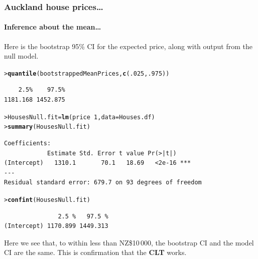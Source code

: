 \documentclass{beamer}\usepackage[]{graphicx}\usepackage[]{xcolor}
\makeatletter
\newcommand{\hlnum}[1]{\textcolor[rgb]{0.686,0.059,0.569}{#1}}%
\newcommand{\hlopt}[1]{\textcolor[rgb]{0,0,0}{#1}}%
\newcommand{\hlstd}[1]{\textcolor[rgb]{0.345,0.345,0.345}{#1}}%
\newcommand{\hlkwb}[1]{\textcolor[rgb]{0.69,0.353,0.396}{#1}}%
\newcommand{\hlkwc}[1]{\textcolor[rgb]{0.333,0.667,0.333}{#1}}%
\newcommand{\hlkwd}[1]{\textcolor[rgb]{0.737,0.353,0.396}{\textbf{#1}}}%
\newenvironment{kframe}{%
 \def\at@end@of@kframe{}%
 \ifinner\ifhmode%
  \def\at@end@of@kframe{\end{minipage}}%
  \begin{minipage}{\columnwidth}%
 \fi\fi%
 \def\FrameCommand##1{\hskip\@totalleftmargin \hskip-\fboxsep
 \colorbox{shadecolor}{##1}\hskip-\fboxsep
     \hskip-\linewidth \hskip-\@totalleftmargin \hskip\columnwidth}%
 \MakeFramed {\advance\hsize-\width
   \@totalleftmargin\z@ \linewidth\hsize
   \@setminipage}}%
 {\par\unskip\endMakeFramed%
 \at@end@of@kframe}
\newenvironment{knitrout}{}{} %
\makeatother
\begin{document}
\begin{frame}[fragile]
\frametitle{Auckland house prices\ldots}
\framesubtitle{Inference  about the mean\ldots}

Here is the bootstrap 95\% CI for the expected price, along with output from the null model.

\begin{knitrout}\scriptsize
{}\color{fgcolor}\begin{kframe}
\begin{alltt}
\hlstd{> }\hlkwd{quantile}\hlstd{(bootstrappedMeanPrices,} \hlkwd{c}\hlstd{(}\hlnum{.025}\hlstd{,} \hlnum{.975}\hlstd{))}
\end{alltt}
\begin{verbatim}
    2.5%    97.5% 
1181.168 1452.875 
\end{verbatim}
\end{kframe}
\end{knitrout}

\begin{knitrout}\scriptsize
{}\color{fgcolor}\begin{kframe}
\begin{alltt}
\hlstd{> }\hlstd{HousesNull.fit}\hlkwb{=}\hlkwd{lm}\hlstd{(price}\hlopt{~}\hlnum{1}\hlstd{,} \hlkwc{data}\hlstd{=Houses.df)}
\hlstd{> }\hlkwd{summary}\hlstd{(HousesNull.fit)}
\end{alltt}
\end{kframe}
\end{knitrout}

\begin{knitrout}\scriptsize
{}\color{fgcolor}\begin{kframe}
\begin{verbatim}
Coefficients:
            Estimate Std. Error t value Pr(>|t|)    
(Intercept)   1310.1       70.1   18.69   <2e-16 ***
---
Residual standard error: 679.7 on 93 degrees of freedom
\end{verbatim}
\end{kframe}
\end{knitrout}

\begin{knitrout}\scriptsize
{}\color{fgcolor}\begin{kframe}
\begin{alltt}
\hlstd{> }\hlkwd{confint}\hlstd{(HousesNull.fit)}
\end{alltt}
\begin{verbatim}
               2.5 %   97.5 %
(Intercept) 1170.899 1449.313
\end{verbatim}
\end{kframe}
\end{knitrout}

Here we see that, to within less than NZ\$10\,000,  the bootstrap CI and the model CI are the same. This is confirmation that the \textbf{CLT}  works.
\end{frame}
\end{document}

